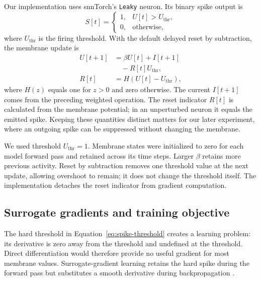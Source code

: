 Our implementation uses snnTorch's \texttt{Leaky} neuron. Its binary spike output is
\begin{equation}
    S[t] =
    \begin{cases}
        1, & U[t] > U_{\mathrm{thr}},\\
        0, & \text{otherwise},
    \end{cases}
    \label{eq:spike-threshold}
\end{equation}
where $U_{\mathrm{thr}}$ is the firing threshold. With the default delayed reset by subtraction, the membrane update is
\begin{equation}
    \begin{aligned}
        U[t+1] &= \beta U[t] + I[t+1]\\
               &\quad - R[t]U_{\mathrm{thr}},\\
        R[t] &= H\!\left(U[t]-U_{\mathrm{thr}}\right),
    \end{aligned}
    \label{eq:lif-update}
\end{equation}
where $H(z)$ equals one for $z>0$ and zero otherwise. The current $I[t+1]$ comes from the preceding weighted operation. The reset indicator $R[t]$ is calculated from the membrane potential; in an unperturbed neuron it equals the emitted spike. Keeping these quantities distinct matters for our later experiment, where an outgoing spike can be suppressed without changing the membrane.

We used threshold $U_{\mathrm{thr}}=1$. Membrane states were initialized to zero for each model forward pass and retained across its time steps. Larger $\beta$ retains more previous activity. Reset by subtraction removes one threshold value at the next update, allowing overshoot to remain; it does not change the threshold itself. The implementation detaches the reset indicator from gradient computation.

\subsection{Surrogate gradients and training objective}

The hard threshold in Equation~\eqref{eq:spike-threshold} creates a learning problem: its derivative is zero away from the threshold and undefined at the threshold. Direct differentiation would therefore provide no useful gradient for most membrane values. Surrogate-gradient learning retains the hard spike during the forward pass but substitutes a smooth derivative during backpropagation \citep{snntorchTutorial6}.

